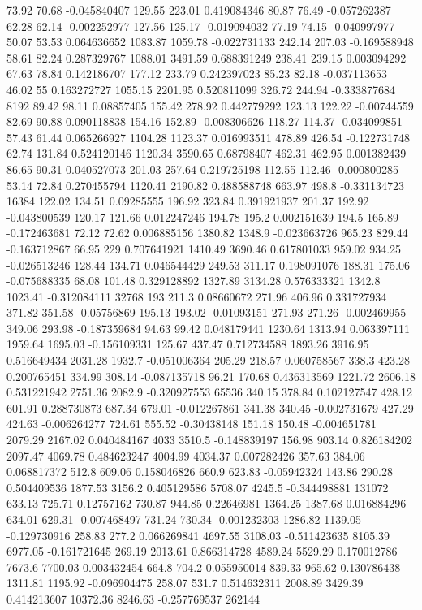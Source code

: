 73.92	70.68	-0.045840407	129.55	223.01	0.419084346	80.87	76.49	-0.057262387	62.28	62.14	-0.002252977	127.56	125.17	-0.019094032	77.19	74.15	-0.040997977	50.07	53.53	0.064636652	1083.87	1059.78	-0.022731133	242.14	207.03	-0.169588948	58.61	82.24	0.287329767	1088.01	3491.59	0.688391249	238.41	239.15	0.003094292	67.63	78.84	0.142186707	177.12	233.79	0.242397023	85.23	82.18	-0.037113653	46.02	55	0.163272727	1055.15	2201.95	0.520811099	326.72	244.94	-0.333877684	8192
89.42	98.11	0.08857405	155.42	278.92	0.442779292	123.13	122.22	-0.00744559	82.69	90.88	0.090118838	154.16	152.89	-0.008306626	118.27	114.37	-0.034099851	57.43	61.44	0.065266927	1104.28	1123.37	0.016993511	478.89	426.54	-0.122731748	62.74	131.84	0.524120146	1120.34	3590.65	0.68798407	462.31	462.95	0.001382439	86.65	90.31	0.040527073	201.03	257.64	0.219725198	112.55	112.46	-0.000800285	53.14	72.84	0.270455794	1120.41	2190.82	0.488588748	663.97	498.8	-0.331134723	16384
122.02	134.51	0.09285555	196.92	323.84	0.391921937	201.37	192.92	-0.043800539	120.17	121.66	0.012247246	194.78	195.2	0.002151639	194.5	165.89	-0.172463681	72.12	72.62	0.006885156	1380.82	1348.9	-0.023663726	965.23	829.44	-0.163712867	66.95	229	0.707641921	1410.49	3690.46	0.617801033	959.02	934.25	-0.026513246	128.44	134.71	0.046544429	249.53	311.17	0.198091076	188.31	175.06	-0.075688335	68.08	101.48	0.329128892	1327.89	3134.28	0.576333321	1342.8	1023.41	-0.312084111	32768
193	211.3	0.08660672	271.96	406.96	0.331727934	371.82	351.58	-0.05756869	195.13	193.02	-0.01093151	271.93	271.26	-0.002469955	349.06	293.98	-0.187359684	94.63	99.42	0.048179441	1230.64	1313.94	0.063397111	1959.64	1695.03	-0.156109331	125.67	437.47	0.712734588	1893.26	3916.95	0.516649434	2031.28	1932.7	-0.051006364	205.29	218.57	0.060758567	338.3	423.28	0.200765451	334.99	308.14	-0.087135718	96.21	170.68	0.436313569	1221.72	2606.18	0.531221942	2751.36	2082.9	-0.320927553	65536
340.15	378.84	0.102127547	428.12	601.91	0.288730873	687.34	679.01	-0.012267861	341.38	340.45	-0.002731679	427.29	424.63	-0.006264277	724.61	555.52	-0.30438148	151.18	150.48	-0.004651781	2079.29	2167.02	0.040484167	4033	3510.5	-0.148839197	156.98	903.14	0.826184202	2097.47	4069.78	0.484623247	4004.99	4034.37	0.007282426	357.63	384.06	0.068817372	512.8	609.06	0.158046826	660.9	623.83	-0.05942324	143.86	290.28	0.504409536	1877.53	3156.2	0.405129586	5708.07	4245.5	-0.344498881	131072
633.13	725.71	0.12757162	730.87	944.85	0.22646981	1364.25	1387.68	0.016884296	634.01	629.31	-0.007468497	731.24	730.34	-0.001232303	1286.82	1139.05	-0.129730916	258.83	277.2	0.066269841	4697.55	3108.03	-0.511423635	8105.39	6977.05	-0.161721645	269.19	2013.61	0.866314728	4589.24	5529.29	0.170012786	7673.6	7700.03	0.003432454	664.8	704.2	0.055950014	839.33	965.62	0.130786438	1311.81	1195.92	-0.096904475	258.07	531.7	0.514632311	2008.89	3429.39	0.414213607	10372.36	8246.63	-0.257769537	262144
